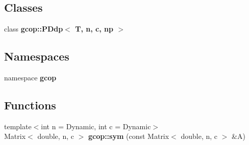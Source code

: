 \subsection*{\-Classes}
\begin{DoxyCompactItemize}
\item 
class {\bf gcop\-::\-P\-Ddp$<$ T, n, c, np $>$}
\end{DoxyCompactItemize}
\subsection*{\-Namespaces}
\begin{DoxyCompactItemize}
\item 
namespace {\bf gcop}
\end{DoxyCompactItemize}
\subsection*{\-Functions}
\begin{DoxyCompactItemize}
\item 
{\footnotesize template$<$int n = \-Dynamic, int c = \-Dynamic$>$ }\\\-Matrix$<$ double, n, c $>$ {\bf gcop\-::sym} (const \-Matrix$<$ double, n, c $>$ \&\-A)
\end{DoxyCompactItemize}
